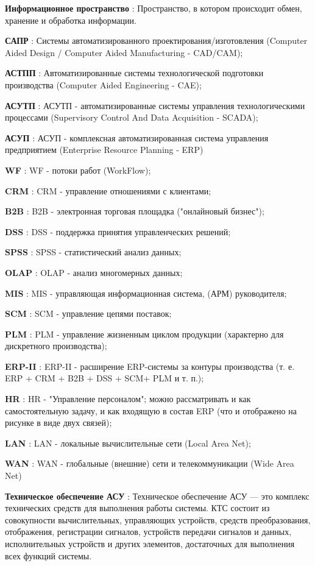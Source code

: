 \textbf{Информационное пространство} :  Пространство, в котором происходит обмен, хранение и обработка информации.

\textbf{САПР} : Системы автоматизированного проектирования/изготовления (Computer Aided Design / Computer Aided Manufacturing - CAD/CAM);

\textbf{АСТПП} : Автоматизированные системы технологической подготовки производства (Computer Aided Engineering - CAE);

\textbf{АСУТП } : АСУТП - автоматизированные системы управления технологическими процессами (Supervisory Control And Data Acquisition - SCADA);

\textbf{АСУП } : АСУП - комплексная автоматизированная система управления предприятием (Enterprise Resource Planning - ERP)

\textbf{WF } : WF - потоки работ (WorkFlow);

\textbf{CRM } : CRM - управление отношениями с клиентами;

\textbf{B2B} : B2B - электронная торговая площадка ("онлайновый бизнес");

\textbf{DSS} : DSS - поддержка принятия управленческих решений;

\textbf{SPSS} : SPSS - статистический анализ данных;

\textbf{OLAP} : OLAP - анализ многомерных данных;

\textbf{MIS} : MIS - управляющая информационная система, (АРМ) руководителя;

\textbf{SCM} : SCM - управление цепями поставок;

\textbf{PLM} : PLM - управление жизненным циклом продукции (характерно для дискретного производства);

\textbf{ERP-II} : ERP-II - расширение ERP-системы за контуры производства (т. е. ERP + CRM + B2B + DSS + SCM+ PLM и т. п.);

\textbf{HR} : HR - "Управление персоналом"; можно рассматривать и как самостоятельную задачу, и как входящую в состав ERP (что и отображено на рисунке в виде двух связей);

\textbf{LAN} : LAN - локальные вычислительные сети (Local Area Net);

\textbf{WAN} : WAN - глобальные (внешние) сети и телекоммуникации (Wide Area Net)

\textbf{Техническое обеспечение АСУ} : Техническое обеспечение АСУ — это комплекс технических средств для выполнения работы системы. КТС состоит из совокупности вычислительных, управляющих устройств, средств преобразования, отображения, регистрации сигналов, устройств передачи сигналов и данных, исполнительных устройств и других элементов, достаточных для выполнения всех функций системы.

